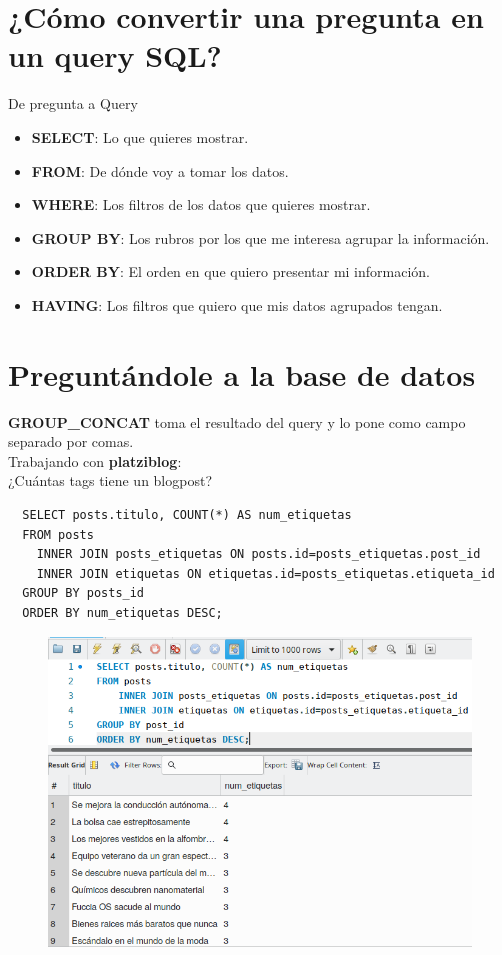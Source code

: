 \documentclass{article}
\begin{document}
\section{¿Cómo convertir una pregunta en un query SQL?}%
De pregunta a Query
\begin{itemize}
  \item \textbf{SELECT}: Lo que quieres mostrar.
  \item \textbf{FROM}: De dónde voy a tomar los datos.
  \item \textbf{WHERE}: Los filtros de los datos que quieres mostrar.
  \item \textbf{GROUP BY}: Los rubros por los que me interesa agrupar la información.
  \item \textbf{ORDER BY}: El orden en que quiero presentar mi información.
  \item \textbf{HAVING}: Los filtros que quiero que mis datos agrupados tengan.
\end{itemize}

\section{Preguntándole a la base de datos}%
\textbf{GROUP\_CONCAT} toma el resultado del query y lo pone como campo
separado por comas.\\

Trabajando con \textbf{platziblog}:\\
¿Cuántas tags tiene un blogpost?\\
\begin{verbatim}
  SELECT posts.titulo, COUNT(*) AS num_etiquetas
  FROM posts
    INNER JOIN posts_etiquetas ON posts.id=posts_etiquetas.post_id
    INNER JOIN etiquetas ON etiquetas.id=posts_etiquetas.etiqueta_id
  GROUP BY posts_id
  ORDER BY num_etiquetas DESC;
\end{verbatim}

\begin{figure}[h!]
  \centering
  \includegraphics[scale=0.75]{./Pictures/135_first_question.png}
\end{figure}
\end{document}
